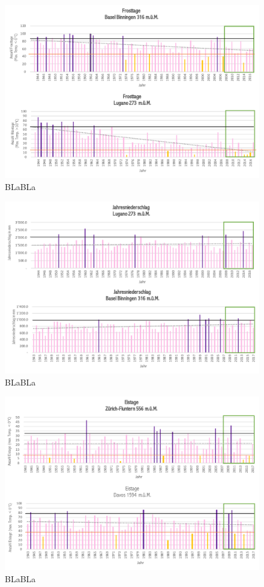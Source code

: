 \begin{refsection}
\begin{figure}[htbp]
\centering
\includegraphics[width=1.0\textwidth]{extrem/Frosttage.pdf}
\caption{BLaBLa}
\label{Frosttage}
\end{figure}


\begin{figure}[htbp]
\centering
\includegraphics[width=1.0\textwidth]{extrem/Jahresniederschlag.pdf}
\caption{BLaBLa}
\label{Jahresniederschlag}
\end{figure}

\begin{figure}[htbp]
\centering
\includegraphics[width=1.0\textwidth]{extrem/Eistage.pdf}
\caption{BLaBLa}
\label{Eistage}
\end{figure}



\end{refsection}

